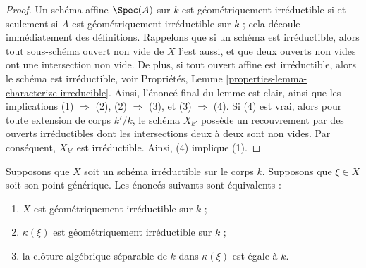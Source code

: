 \begin{proof}
Un schéma affine $\Spec(A)$ sur $k$ est géométriquement
irréductible si et seulement si $A$ est géométriquement
irréductible sur $k$ ; cela découle immédiatement des
définitions. Rappelons que si un schéma est irréductible, alors
tout sous-schéma ouvert non vide de $X$ l'est aussi, et que deux
ouverts non vides ont une intersection non vide. De plus, si tout
ouvert affine est irréductible, alors le schéma est irréductible,
voir Propriétés, Lemme
\ref{properties-lemma-characterize-irreducible}. Ainsi, l'énoncé final du
lemme est clair, ainsi que les implications (1) $\Rightarrow$ (2), (2)
$\Rightarrow$ (3), et (3) $\Rightarrow$ (4). Si (4) est vrai, alors pour
toute extension de corps $k'/k$, le schéma $X_{k'}$ possède un recouvrement
par des ouverts irréductibles dont les intersections deux à deux sont non
vides. Par conséquent, $X_{k'}$ est irréductible. Ainsi, (4) implique (1).
\end{proof}

\begin{lemma}
\label{lemma-geometrically-irreducible-function-field}
Supposons que $X$ soit un schéma irréductible sur le corps $k$. Supposons que
$\xi \in X$ soit son point générique. Les énoncés suivants sont équivalents :
\begin{enumerate}
\item $X$ est géométriquement irréductible sur $k$ ; \item
$\kappa(\xi)$ est géométriquement irréductible sur $k$ ; \item la
clôture algébrique séparable de $k$ dans $\kappa(\xi)$ est égale à $k$.
\end{enumerate}
\end{lemma}


